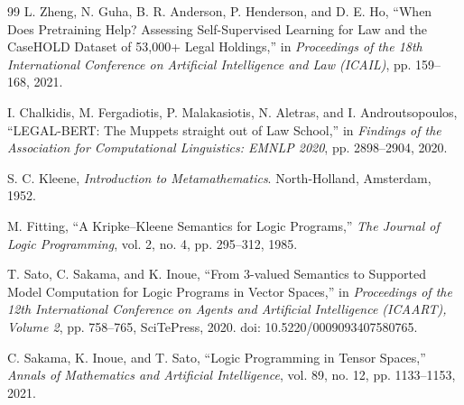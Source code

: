 \begin{thebibliography}{99}
L. Zheng, N. Guha, B. R. Anderson, P. Henderson, and D. E. Ho,
``When Does Pretraining Help? Assessing Self-Supervised Learning for Law and
the CaseHOLD Dataset of 53,000+ Legal Holdings,''
in \textit{Proceedings of the 18th International Conference on Artificial
Intelligence and Law (ICAIL)},
pp. 159--168, 2021.

I. Chalkidis, M. Fergadiotis, P. Malakasiotis, N. Aletras, and
I. Androutsopoulos,
``LEGAL-BERT: The Muppets straight out of Law School,''
in \textit{Findings of the Association for Computational Linguistics:
EMNLP 2020},
pp. 2898--2904, 2020.

S. C. Kleene,
\textit{Introduction to Metamathematics}.
North-Holland, Amsterdam, 1952.

M. Fitting,
``A Kripke--Kleene Semantics for Logic Programs,''
\textit{The Journal of Logic Programming},
vol. 2, no. 4, pp. 295--312, 1985.

T. Sato, C. Sakama, and K. Inoue,
``From 3-valued Semantics to Supported Model Computation for
Logic Programs in Vector Spaces,''
in \textit{Proceedings of the 12th International Conference on
Agents and Artificial Intelligence (ICAART), Volume 2},
pp. 758--765, SciTePress, 2020.
doi: 10.5220/0009093407580765.

C. Sakama, K. Inoue, and T. Sato,
``Logic Programming in Tensor Spaces,''
\textit{Annals of Mathematics and Artificial Intelligence},
vol. 89, no. 12, pp. 1133--1153, 2021.


\end{thebibliography}
